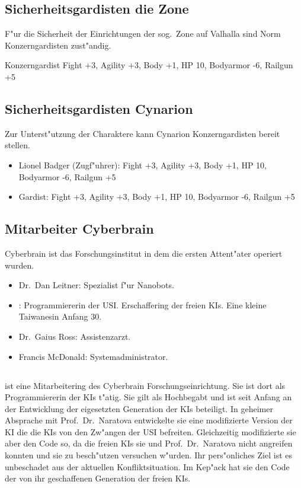 \subsection{Sicherheitsgardisten die Zone}

F"ur die Sicherheit der Einrichtungen der sog.~Zone auf Valhalla sind Norm Konzerngardisten zust"andig.

Konzerngardist Fight +3, Agility +3, Body +1, HP 10, Bodyarmor -6, Railgun +5

\subsection{Sicherheitsgardisten Cynarion}

Zur Unterst"utzung der Charaktere kann Cynarion Konzerngardisten bereit stellen.

\begin{itemize}
    \item Lionel Badger (Zugf"uhrer): Fight +3, Agility +3, Body +1, HP 10, Bodyarmor -6, Railgun +5
    \item Gardist: Fight +3, Agility +3, Body +1, HP 10, Bodyarmor -6, Railgun +5
\end{itemize}

\renewcommand{\ml}{\pinyin{Mailin2}}

\subsection{Mitarbeiter Cyberbrain}

Cyberbrain ist das Forschungsinstitut in dem die ersten Attent"ater operiert wurden.

\begin{itemize}
    \item Dr.~Dan Leitner: Spezialist f"ur Nanobots.
    \item \ml{}: Programmiererin der USI. Erschaffering der freien KIs. Eine kleine Taiwanesin Anfang 30. 
    \item Dr.~Gaius Ross: Assistenzarzt.
    \item Francis McDonald: Systemadministrator.
\end{itemize}

\subsection[Mailin]{\ml{}}

\ml{} ist eine Mitarbeitering des Cyberbrain Forschungseinrichtung. Sie ist dort als Programmiererin der KIs t"atig. Sie gilt als Hochbegabt und ist seit Anfang an der Entwicklung der eigesetzten Generation der KIs beteiligt. In geheimer Absprache mit Prof.~Dr.~Naratova entwickelte sie eine modifizierte Version der KI die die KIs von den Zw"angen der USI befreiten. Gleichzeitig modifizierte sie aber den Code so, da\3 die freien KIs sie und Prof.~Dr.~Naratova nicht angreifen konnten und sie zu besch"utzen versuchen w"urden. Ihr pers"onliches Ziel ist es unbeschadet aus der aktuellen Konfliktsituation. Im Kep"ack hat sie den Code der von ihr geschaffenen Generation der freien KIs.


